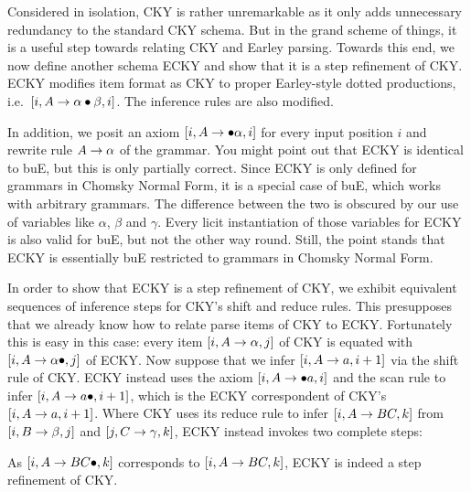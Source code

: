 Considered in isolation, CKY is rather unremarkable as it only adds unnecessary redundancy to the standard CKY schema.
But in the grand scheme of things, it is a useful step towards relating CKY and Earley parsing.
Towards this end, we now define another schema ECKY and show that it is a step refinement of CKY.
ECKY modifies item format as CKY to proper Earley-style dotted productions, i.e.\ $[i, A \rewrite \alpha \psep \beta, i]$.
The inference rules are also modified.
%
\begin{prooftree}
\end{prooftree}
%
\begin{prooftree}
\end{prooftree}
%
In addition, we posit an axiom $[i, A \rewrite \psep \alpha, i]$ for every input position $i$ and rewrite rule $A \rewrite \alpha$ of the grammar.
You might point out that ECKY is identical to buE, but this is only partially correct.
Since ECKY is only defined for grammars in Chomsky Normal Form, it is a special case of buE, which works with arbitrary grammars.
The difference between the two is obscured by our use of variables like $\alpha$, $\beta$ and $\gamma$.
Every licit instantiation of those variables for ECKY is also valid for buE, but not the other way round.
Still, the point stands that ECKY is essentially buE restricted to grammars in Chomsky Normal Form.

In order to show that ECKY is a step refinement of CKY, we exhibit equivalent sequences of inference steps for CKY's shift and reduce rules.
This presupposes that we already know how to relate parse items of CKY to ECKY\@.
Fortunately this is easy in this case: every item $[i, A \rewrite \alpha, j]$ of CKY is equated with $[i, A \rewrite \alpha \psep, j]$ of ECKY\@.
Now suppose that we infer $[i, A \rewrite a, i+1]$ via the shift rule of CKY.
ECKY instead uses the axiom $[i, A \rewrite \psep a, i]$ and the scan rule to infer $[i, A \rewrite a \psep, i+1]$, which is the ECKY correspondent of CKY's $[i, A \rewrite a, i+1]$.
Where CKY uses its reduce rule to infer $[i, A \rewrite BC, k]$ from $[i, B \rewrite \beta, j]$ and $[j, C \rewrite \gamma, k]$, ECKY instead invokes two complete steps:
%
\begin{prooftree}
\end{prooftree}
%
As $[i, A \rewrite B C \psep, k]$ corresponds to $[i, A \rewrite B C, k]$, ECKY is indeed a step refinement of CKY.


